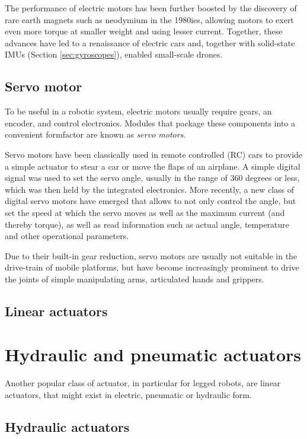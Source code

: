 The performance of electric motors has been further boosted by the discovery of rare earth magnets such as neodymium in the 1980ies, allowing motors to exert even more torque at smaller weight and using lesser current. Together, these advances have led to a renaissance of electric cars and, together with solid-state IMUs (Section \ref{sec:gyroscopes}), enabled small-scale drones.

\subsection{Servo motor}
To be useful in a robotic system, electric motors usually require gears, an encoder, and control electronics. Modules that package these components into a convenient formfactor are known as \emph{servo motors}. 

Servo motors have been classically used in remote controlled (RC) cars to provide a simple actuator to stear a car or move the flaps of an airplane. A simple digital signal was used to set the servo angle, usually in the range of 360 degrees or less, which was then held by the integrated electronics. More recently, a new class of digital servo motors have emerged that allows to not only control the angle, but set the speed at which the servo moves as well as the maximum current (and thereby torque), as well as read information such as actual angle, temperature and other operational parameters. 

Due to their built-in gear reduction, servo motors are usually not suitable in the drive-train of mobile platforms, but have become increasingly prominent to drive the joints of simple manipulating arms, articulated hands and grippers. 

\subsection{Linear actuators}

\section{Hydraulic and pneumatic actuators}
Another popular class of actuator, in particular for legged robots, are linear actuators, that might exist in electric, pneumatic or hydraulic form. 

\subsection{Hydraulic actuators}
